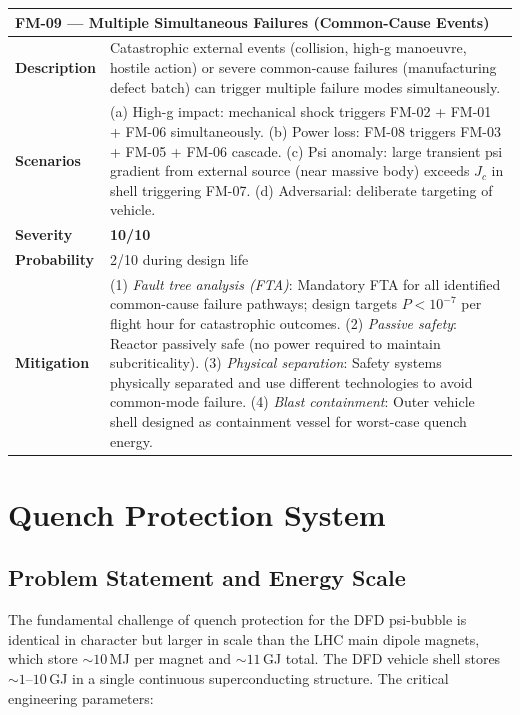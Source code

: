 \documentclass[11pt,a4paper]{article}
\newcommand{\Scrit}[1]{\cellcolor{risk-critical!40}\textbf{#1}}
\begin{document}
\begin{longtable}{p{0.25\tw}p{0.65\tw}}
\toprule
\multicolumn{2}{l}{\textbf{FM-09 --- Multiple Simultaneous Failures
  (Common-Cause Events)}} \\
\midrule
\endhead
\textbf{Description} &
  Catastrophic external events (collision, high-g manoeuvre, hostile
  action) or severe common-cause failures (manufacturing defect
  batch) can trigger multiple failure modes simultaneously. \\[4pt]
\textbf{Scenarios} &
  (a) High-g impact: mechanical shock triggers FM-02 + FM-01 + FM-06
  simultaneously. (b) Power loss: FM-08 triggers FM-03 + FM-05 + FM-06
  cascade. (c) Psi anomaly: large transient psi gradient from external
  source (near massive body) exceeds $J_c$ in shell triggering FM-07.
  (d) Adversarial: deliberate targeting of vehicle. \\[4pt]
\textbf{Severity} & \Scrit{10/10} \\[4pt]
\textbf{Probability} & 2/10 during design life \\[4pt]
\textbf{Mitigation} &
  (1) \textit{Fault tree analysis (FTA)}: Mandatory FTA for all
  identified common-cause failure pathways; design targets $P < 10^{-7}$
  per flight hour for catastrophic outcomes. (2) \textit{Passive
  safety}: Reactor passively safe (no power required to maintain
  subcriticality). (3) \textit{Physical separation}: Safety systems
  physically separated and use different technologies to avoid
  common-mode failure. (4) \textit{Blast containment}: Outer vehicle
  shell designed as containment vessel for worst-case quench energy. \\
\bottomrule
\end{longtable}

\section{Quench Protection System}
\label{sec:quench}

\subsection{Problem Statement and Energy Scale}

The fundamental challenge of quench protection for the DFD psi-bubble
is identical in character but larger in scale than the LHC main dipole
magnets, which store $\sim 10$\,MJ per magnet and $\sim 11$\,GJ total.
The DFD vehicle shell stores $\sim 1$--$10$\,GJ in a single continuous
superconducting structure. The critical engineering parameters:
\end{document}
